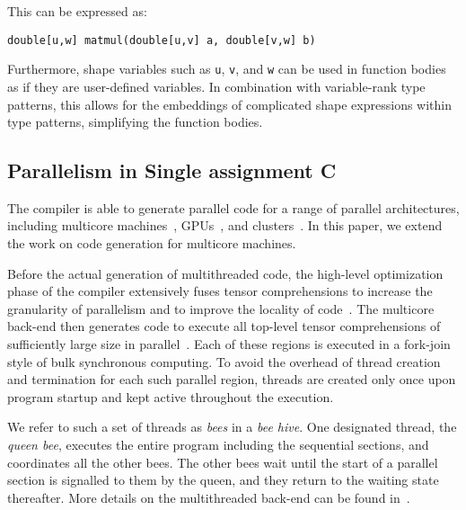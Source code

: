This can be expressed as:

\begin{verbatim}
double[u,w] matmul(double[u,v] a, double[v,w] b)
\end{verbatim}

Furthermore, shape variables such as \verb|u|, \verb|v|, and \verb|w| can be used in function bodies as if they are user-defined variables.
In combination with variable-rank type patterns, this allows for the embeddings of complicated shape expressions within type patterns, simplifying the function bodies.

\subsection{Parallelism in Single assignment C}\label{sac-par}

The \sac{} compiler is able to generate parallel code for a range of parallel architectures, including multicore machines~\cite{sac-shared}, GPUs~\cite{sac-gpu,sac-gpu2}, and clusters~\cite{sac-mpi}.
In this paper, we extend the work on code generation for multicore machines.

Before the actual generation of multithreaded code, the high-level optimization phase of the compiler extensively fuses tensor comprehensions to increase the granularity of parallelism and to improve the locality of code~\cite{sac1}.
The multicore back-end then generates code to execute all top-level tensor comprehensions of sufficiently large size in parallel~\cite{sac-shared}.
Each of these regions is executed in a fork-join style of bulk synchronous computing.
To avoid the overhead of thread creation and termination for each such parallel region, threads are created only once upon program startup and kept active throughout the execution.

We refer to such a set of threads as \textit{bees} in a \textit{bee hive}.
One designated thread, the \textit{queen bee}, executes the entire program including the sequential sections, and coordinates all the other bees.
The other bees wait until the start of a parallel section is signalled to them by the queen, and they return to the waiting state thereafter.
More details on the multithreaded back-end can be found in~\cite{sac-shared}.
